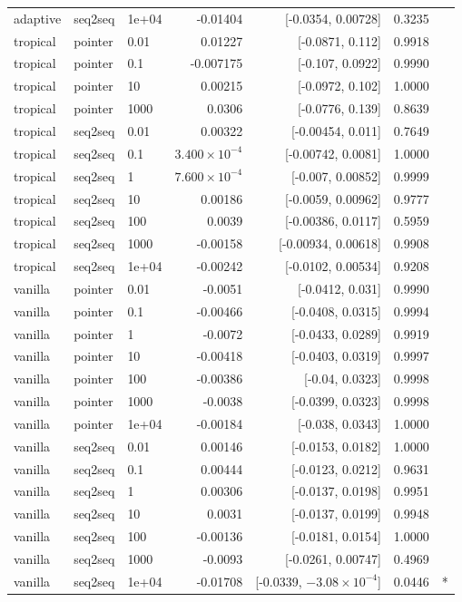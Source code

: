 \documentclass[10pt]{article}
\begin{document}
{\begin{longtable}{lllrrrl}
adaptive & seq2seq & 1e+04 & -0.01404 & [-0.0354, 0.00728] & 0.3235 & \\
tropical & pointer & 0.01 & 0.01227 & [-0.0871, 0.112] & 0.9918 & \\
tropical & pointer & 0.1 & -0.007175 & [-0.107, 0.0922] & 0.9990 & \\
tropical & pointer & 10 & 0.00215 & [-0.0972, 0.102] & 1.0000 & \\
tropical & pointer & 1000 & 0.0306 & [-0.0776, 0.139] & 0.8639 & \\
tropical & seq2seq & 0.01 & 0.00322 & [-0.00454, 0.011] & 0.7649 & \\
tropical & seq2seq & 0.1 & $3.400\times10^{-4}$ & [-0.00742, 0.0081] & 1.0000 & \\
tropical & seq2seq & 1 & $7.600\times10^{-4}$ & [-0.007, 0.00852] & 0.9999 & \\
tropical & seq2seq & 10 & 0.00186 & [-0.0059, 0.00962] & 0.9777 & \\
tropical & seq2seq & 100 & 0.0039 & [-0.00386, 0.0117] & 0.5959 & \\
tropical & seq2seq & 1000 & -0.00158 & [-0.00934, 0.00618] & 0.9908 & \\
tropical & seq2seq & 1e+04 & -0.00242 & [-0.0102, 0.00534] & 0.9208 & \\
vanilla & pointer & 0.01 & -0.0051 & [-0.0412, 0.031] & 0.9990 & \\
vanilla & pointer & 0.1 & -0.00466 & [-0.0408, 0.0315] & 0.9994 & \\
vanilla & pointer & 1 & -0.0072 & [-0.0433, 0.0289] & 0.9919 & \\
vanilla & pointer & 10 & -0.00418 & [-0.0403, 0.0319] & 0.9997 & \\
vanilla & pointer & 100 & -0.00386 & [-0.04, 0.0323] & 0.9998 & \\
vanilla & pointer & 1000 & -0.0038 & [-0.0399, 0.0323] & 0.9998 & \\
vanilla & pointer & 1e+04 & -0.00184 & [-0.038, 0.0343] & 1.0000 & \\
vanilla & seq2seq & 0.01 & 0.00146 & [-0.0153, 0.0182] & 1.0000 & \\
vanilla & seq2seq & 0.1 & 0.00444 & [-0.0123, 0.0212] & 0.9631 & \\
vanilla & seq2seq & 1 & 0.00306 & [-0.0137, 0.0198] & 0.9951 & \\
vanilla & seq2seq & 10 & 0.0031 & [-0.0137, 0.0199] & 0.9948 & \\
vanilla & seq2seq & 100 & -0.00136 & [-0.0181, 0.0154] & 1.0000 & \\
vanilla & seq2seq & 1000 & -0.0093 & [-0.0261, 0.00747] & 0.4969 & \\
vanilla & seq2seq & 1e+04 & -0.01708 & [-0.0339, $-3.08\times10^{-4}$] & 0.0446 & *\\
\bottomrule
\end{longtable}
}
\end{document}
